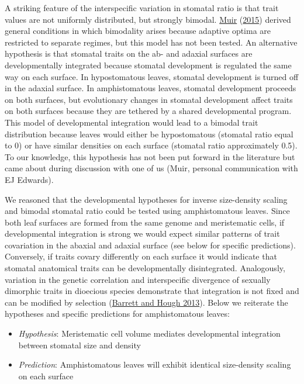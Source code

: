 \documentclass[
  10pt,
]{article}
\begin{document}
A striking feature of the interspecific variation in stomatal ratio is that trait values are not uniformly distributed, but strongly bimodal. \protect\hyperlink{ref-muir_making_2015}{Muir} (\protect\hyperlink{ref-muir_making_2015}{2015}) derived general conditions in which bimodality arises because adaptive optima are restricted to separate regimes, but this model has not been tested. An alternative hypothesis is that stomatal traits on the ab- and adaxial surfaces are developmentally integrated because stomatal development is regulated the same way on each surface. In hypostomatous leaves, stomatal development is turned off in the adaxial surface. In amphistomatous leaves, stomatal development proceeds on both surfaces, but evolutionary changes in stomatal development affect traits on both surfaces because they are tethered by a shared developmental program. This model of developmental integration would lead to a bimodal trait distribution because leaves would either be hypostomatous (stomatal ratio equal to 0) or have similar densities on each surface (stomatal ratio approximately 0.5). To our knowledge, this hypothesis has not been put forward in the literature but came about during discussion with one of us (Muir, personal communication with EJ Edwards).

We reasoned that the developmental hypotheses for inverse size-density scaling and bimodal stomatal ratio could be tested using amphistomatous leaves. Since both leaf surfaces are formed from the same genome and meristematic cells, if developmental integration is strong we would expect similar patterns of trait covariation in the abaxial and adaxial surface (see below for specific predictions). Conversely, if traits covary differently on each surface it would indicate that stomatal anatomical traits can be developmentally disintegrated. Analogously, variation in the genetic correlation and interspecific divergence of sexually dimorphic traits in dioecious species demonstrate that integration is not fixed and can be modified by selection (\protect\hyperlink{ref-barrett_sexual_2013}{Barrett and Hough 2013}). Below we reiterate the hypotheses and specific predictions for amphistomatous leaves:


\begin{itemize}
\item
  \emph{Hypothesis}: Meristematic cell volume mediates developmental integration between stomatal size and density
\item
  \emph{Prediction}: Amphistomatous leaves will exhibit identical size-density scaling on each surface
\end{itemize}
\end{document}
